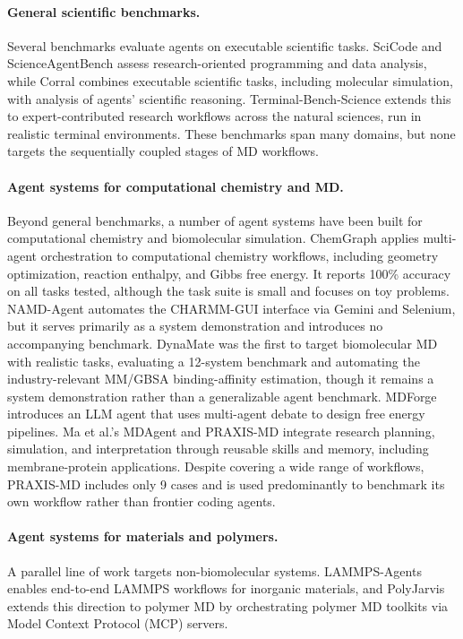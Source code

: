 \paragraph{General scientific benchmarks.} Several benchmarks evaluate agents on executable scientific tasks. SciCode\cite{tian2024scicode} and ScienceAgentBench\cite{chen2025scienceagentbench} assess research-oriented programming and data analysis, while Corral\cite{corral} combines executable scientific tasks, including molecular simulation, with analysis of agents' scientific reasoning. Terminal-Bench-Science\cite{dillmann2026tbscience} extends this to expert-contributed research workflows across the natural sciences, run in realistic terminal environments. These benchmarks span many domains, but none targets the sequentially coupled stages of MD workflows.

\paragraph{Agent systems for computational chemistry and MD.} Beyond general benchmarks, a number of agent systems have been built for computational chemistry and biomolecular simulation. ChemGraph\cite{pham2026chemgraph} applies multi-agent orchestration to computational chemistry workflows, including geometry optimization, reaction enthalpy, and Gibbs free energy. It reports 100\% accuracy on all tasks tested, although the task suite is small and focuses on toy problems. NAMD-Agent\cite{chandrasekhar2025namdagent} automates the CHARMM-GUI interface\cite{jo2008charmm} via Gemini\cite{team2023gemini} and Selenium, but it serves primarily as a system demonstration and introduces no accompanying benchmark. DynaMate\cite{guilbert2025dynamate} was the first to target biomolecular MD with realistic tasks, evaluating a 12-system benchmark and automating the industry-relevant MM/GBSA binding-affinity estimation, though it remains a system demonstration rather than a generalizable agent benchmark. MDForge\cite{wang2026mdforge} introduces an LLM agent that uses multi-agent debate to design free energy pipelines. Ma et al.'s MDAgent and PRAXIS-MD\cite{ma2026praxismd} integrate research planning, simulation, and interpretation through reusable skills and memory, including membrane-protein applications. Despite covering a wide range of workflows, PRAXIS-MD includes only 9 cases and is used predominantly to benchmark its own workflow rather than frontier coding agents.

\paragraph{Agent systems for materials and polymers.} A parallel line of work targets non-biomolecular systems. LAMMPS-Agents\cite{vriza2026multiagentic} enables end-to-end LAMMPS\cite{thompson2022lammps} workflows for inorganic materials, and PolyJarvis\cite{zhao2026polyjarvis} extends this direction to polymer MD by orchestrating polymer MD toolkits via Model Context Protocol (MCP) servers.

